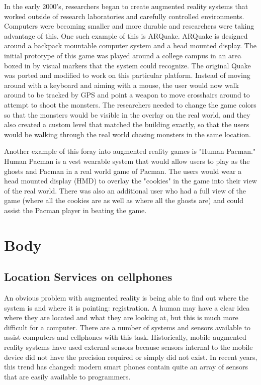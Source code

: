 \documentclass{acm_proc_article-sp}
\begin{document}
In the early 2000's, researchers began to create augmented reality systems that worked outside of research laboratories and carefully controlled environments.  Computers were becoming smaller and more durable and researchers were taking advantage of this. One such example of this is ARQuake.  ARQuake is designed around a backpack mountable computer system and a head mounted display.  The initial prototype of this game was played around a college campus in an area boxed in by visual markers that the system could recognize. The original Quake was ported and modified to work on this particular platform.  Instead of moving around with a keyboard and aiming with a mouse, the user would now walk around to be tracked by GPS and point a weapon to move crosshairs around to attempt to shoot the monsters.  The researchers needed to change the game colors so that the monsters would be visible in the overlay on the real world, and they also created a custom level that matched the building exactly, so that the users would be walking through the real world chasing monsters in the same location.  \cite{thomas2000arquake}

Another example of this foray into augmented reality games is "Human Pacman."  Human Pacman is a vest wearable system that would allow users to play as the ghosts and Pacman in a real world game of Pacman.  The users would wear a head mounted display (HMD) to overlay the "cookies" in the game into their view of the real world.  There was also an additional user who had a full view of the game (where all the cookies are as well as where all the ghosts are) and could assist the Pacman player in beating the game.  \cite{cheok2004human}

\section{Body}
\subsection{Location Services on cellphones}

An obvious problem with augmented reality is being able to find out where the system is and where it is pointing: registration.  A human may have a clear idea where they are located and what they are looking at, but this is much more difficult for a computer. \cite{szeliski2010computer}  There are a number of systems and sensors available to assist computers and cellphones with this task.  
Historically, mobile augmented reality systems have used external sensors because sensors internal to the mobile device did not have the precision required or simply did not exist.  In recent years, this trend has changed:  modern smart phones contain quite an array of sensors that are easily available to programmers.  
\end{document}
